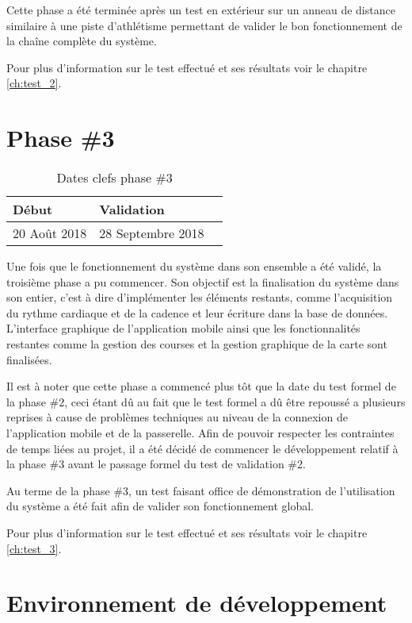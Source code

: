 Cette phase a été terminée après un test en extérieur sur un anneau de distance similaire à une piste d'athlétisme permettant de valider le bon fonctionnement de la chaîne complète du système.

Pour plus d'information sur le test effectué et ses résultats voir le chapitre \ref{ch:test_2}.

\section{Phase \#3}

\begin{table}[htb]
\caption{Dates clefs phase \#3}
\label{tab:detail_phase_3}
\centering
\begin{tabular}{ l l l }
\toprule
Début & Validation \\
\midrule
20 Août 2018 & 28 Septembre 2018  \\
\bottomrule 
\end{tabular}
\end{table}

Une fois que le fonctionnement du système dans son ensemble a été validé, la troisième phase a pu commencer. Son objectif est la finalisation du système dans son entier, c'est à dire d'implémenter les éléments restants, comme l'acquisition du rythme cardiaque et de la cadence et leur écriture dans la base de données. L'interface graphique de l'application mobile ainsi que les fonctionnalités restantes comme la gestion des courses et la gestion graphique de la carte sont finalisées.

Il est à noter que cette phase a commencé plus tôt que la date du test formel de la phase \#2, ceci étant dû au fait que le test formel a dû être repoussé a plusieurs reprises à cause de problèmes techniques au niveau de la connexion de l'application mobile et de la passerelle. Afin de pouvoir respecter les contraintes de temps liées au projet, il a été décidé de commencer le développement relatif à la phase \#3 avant le passage formel du test de validation \#2.

Au terme de la phase \#3, un test faisant office de démonstration de l'utilisation du système a été fait afin de valider son fonctionnement global.

Pour plus d'information sur le test effectué et ses résultats voir le chapitre \ref{ch:test_3}.

\section{Environnement de développement}

